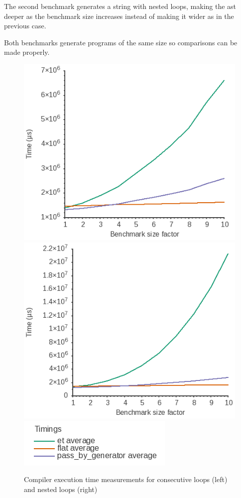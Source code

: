 \documentclass[../main]{subfiles}
\begin{document}
The second benchmark generates a string with
nested loops, making the \gls{ast} deeper as the benchmark size increases instead
of making it wider as in the previous case.

Both benchmarks generate programs of the same size so comparisons can be made
properly.

\begin{figure}
\includegraphics[scale=0.5]{images/bf-consecutive_loops.png}
\includegraphics[scale=0.5]{images/bf-imbricated_loops.png}
\includegraphics[scale=0.5]{images/bf-graph-legend.png}
\caption{
  Compiler execution time measurements for consecutive loops (left)
  and nested loops (right)
}\label{fig:bf-bench}
\end{figure}
\end{document}
